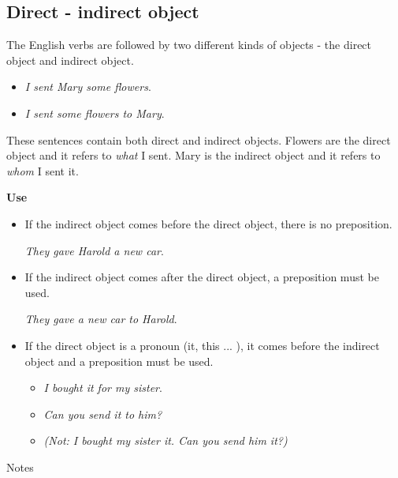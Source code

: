 \subsection{Direct - indirect object}

The English verbs are followed by two different kinds of objects - the direct object and indirect object.

\begin{itemize}

\item \textit{I sent Mary some flowers}.
\item \textit{I sent some flowers to Mary}.
\end{itemize}

These sentences contain both direct and indirect objects. Flowers are the direct object and it refers to \textit{what} I sent. Mary is the indirect object and it refers to \textit{whom} I sent it.

\textbf{Use}

\begin{itemize}

\item If the indirect object comes before the direct object, there is no preposition.

\textit{They gave Harold a new car}.

\item If the indirect object comes after the direct object, a preposition must be used.

\textit{They gave a new car to Harold}.

\item If the direct object is a pronoun (it, this ... ), it comes before the indirect object and a preposition must be used.

\begin{itemize}
\item \textit{I bought it for my sister}.
\item \textit{Can you send it to him?}
\item \textit{(Not: I bought my sister it. Can you send him it?)}
\end{itemize}

\end{itemize}

Notes

